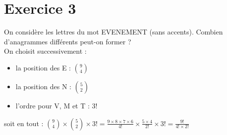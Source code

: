 \documentclass[11pt,a4paper]{article}
\begin{document}
\section*{Exercice 3}
On considère les lettres du mot EVENEMENT (sans accents). Combien d'anagrammes différents peut-on former ? \\
On choisit successivement :
\begin{itemize}
    \item la position des E : $\binom{9}{4}$
    
    \item la position des N : $\binom{5}{2}$
    
    \item l'ordre pour V, M et T : $3!$
\end{itemize}
soit en tout : $\binom{9}{4} \times \binom{5}{2} \times 3! = \frac{9 \times 8 \times 7 \times 6}{4!} \times \frac{5 \times 4}{2!} \times 3! = \frac{9!}{4! \times 2!}$
\end{document}

